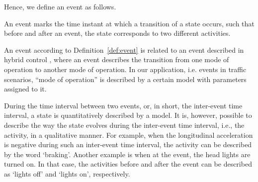 Hence, we define an event as follows.
\begin{definition}[Event] \label{def:event}
	An event marks the time instant at which a transition of a state occurs, such that before and after an event, the state corresponds to two different activities.  %
\end{definition}

An event according to Definition~\ref{def:event} is related to an event described in hybrid control \cite{boel1999hybridcontrol}, where an event describes the transition from one mode of operation to another mode of operation. In our application, i.e. events in traffic scenarios, ``mode of operation'' is described by a certain model with parameters assigned to it.

During the time interval between two events, or, in short, the inter-event time interval, a state is quantitatively described by a model. It is, however, possible to describe the way the state evolves during the inter-event time interval, i.e., the activity, in a qualitative manner. For example, when the longitudinal acceleration is negative during such an inter-event time interval, the activity can be described by the word `braking'. Another example is when at the event, the head lights are turned on. In that case, the activities before and after the event can be described as `lights off' and `lights on', respectively.
